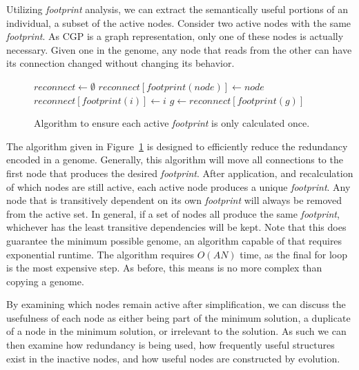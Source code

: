 \documentclass[journal]{IEEEtran}
\begin{document}
Utilizing \emph{footprint} analysis, we can extract the semantically useful
portions of an individual, a subset of the active nodes.  Consider two active
nodes with the same \emph{footprint}.  As CGP is a graph representation, only
one of these nodes is actually necessary.  Given one in the genome, any node that reads
from the other can have its connection changed without changing its behavior.

\begin{figure}
  \begin{algorithmic}
    \State $reconnect \leftarrow \emptyset$
      \State $reconnect[footprint(node)] \leftarrow node$
    \EndFor
      \State $reconnect[footprint(i)] \leftarrow i$
    \EndFor
          \State $g \leftarrow reconnect[footprint(g)]$
        \EndIf
      \EndIf
    \EndFor
  \EndProcedure
  \end{algorithmic}
  \caption{Algorithm to ensure each active \emph{footprint} is only
           calculated once.}
  \label{fig:simplify}
\end{figure}

The  algorithm given in Figure~\ref{fig:simplify} is designed
to efficiently reduce the redundancy encoded in a genome.  Generally, this
algorithm will move all connections to the first node that produces the desired
\emph{footprint}.  After application, and recalculation of which nodes are still
active, each active node produces a unique \emph{footprint}.  Any node that is
transitively dependent on its own \emph{footprint} will always be removed from
the active set.  In general, if a set of nodes all produce the same \emph{footprint},
whichever has the least transitive dependencies will be kept.  Note that this
does guarantee the minimum possible genome, an algorithm capable of that requires
exponential runtime.  The  algorithm requires $O(AN)$ time,
as the final for loop is the most expensive step.  As before, this means
 is no more complex than copying a genome.

By examining which nodes remain active after simplification, we can discuss
the usefulness of each node as either being part of the minimum solution, a
duplicate of a node in the minimum solution, or irrelevant to the solution.
As such we can then examine how redundancy is being used, how frequently useful
structures exist in the inactive nodes, and how useful nodes are constructed by evolution.
\end{document}
